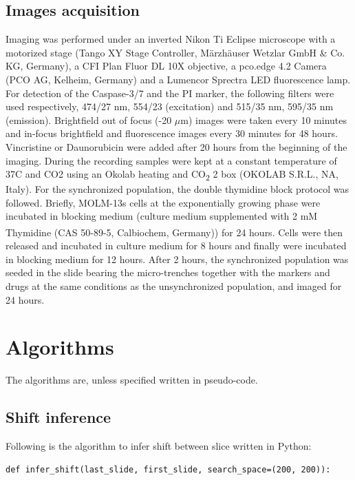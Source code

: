 \documentclass[pdftex,12pt,a4paper]{report}
\begin{document}
\begin{appendices}
\section{Images acquisition}
\label{appendix:imageacquisition}


Imaging was performed under an inverted Nikon Ti Eclipse microscope with a motorized stage (Tango XY Stage Controller, M\"arzh\"auser Wetzlar GmbH \& Co. KG, Germany), a CFI Plan Fluor DL 10X objective, a pco.edge 4.2 Camera (PCO AG, Kelheim, Germany) and a Lumencor Sprectra LED fluorescence lamp. For detection of the Caspase-3/7 and the PI marker, the following filters were used respectively, 474/27 nm, 554/23 (excitation) and 515/35 nm, 595/35 nm (emission). Brightfield out of focus (-20 $\mu$m) images were taken every 10 minutes and in-focus  brightfield and fluorescence images every 30 minutes for 48 hours. Vincristine or Daunorubicin were added after 20 hours from the beginning of the imaging. During the recording samples were kept at a constant temperature of 37\degree C and CO2 using an Okolab heating and CO\textsubscript{2} 2 box (OKOLAB S.R.L., NA, Italy). For the synchronized population, the double thymidine block protocol was followed. Briefly, MOLM-13s cells at the exponentially growing phase were incubated in blocking medium (culture medium supplemented with 2 mM Thymidine (CAS 50-89-5, Calbiochem\textsuperscript{\textregistered}, Germany)) for 24 hours. Cells were then released and incubated in culture medium for 8 hours and finally were incubated in blocking medium for 12 hours. After 2 hours, the synchronized population was seeded in the slide bearing the micro-trenches together with the markers and drugs at the same conditions as the unsynchronized population, and imaged for 24 hours.

\chapter{Algorithms}
\label{appendix:algo}

The algorithms are, unless specified written in pseudo-code.

\section*{Shift inference} 

Following is the algorithm to infer shift between slice written in Python:

\begin{verbatim}
def infer_shift(last_slide, first_slide, search_space=(200, 200)):
    

\end{verbatim}
\end{appendices}
\end{document}
